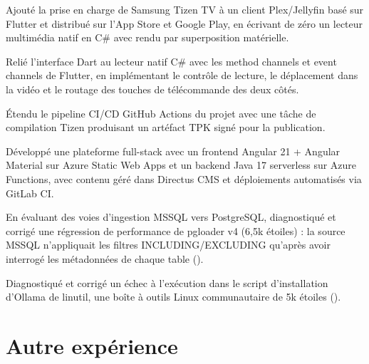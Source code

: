 \documentclass[letterpaper,10pt]{article}
\begin{document}
\begin{resume_list}
\item Ajouté la prise en charge de Samsung Tizen TV à un client Plex/Jellyfin basé sur Flutter et distribué sur l'App Store et Google Play, en écrivant de zéro un lecteur multimédia natif en C\# avec rendu par superposition matérielle.
\item Relié l'interface Dart au lecteur natif C\# avec les method channels et event channels de Flutter, en implémentant le contrôle de lecture, le déplacement dans la vidéo et le routage des touches de télécommande des deux côtés.
\item Étendu le pipeline CI/CD GitHub Actions du projet avec une tâche de compilation Tizen produisant un artéfact TPK signé pour la publication.
\end{resume_list}

\begin{resume_list}
\item Développé une plateforme full-stack avec un frontend Angular 21 + Angular Material sur Azure Static Web Apps et un backend Java 17 serverless sur Azure Functions, avec contenu géré dans Directus CMS et déploiements automatisés via GitLab CI.
\end{resume_list}

\begin{resume_list}
\item En évaluant des voies d'ingestion MSSQL vers PostgreSQL, diagnostiqué et corrigé une régression de performance de pgloader v4 (6,5k étoiles) : la source MSSQL n'appliquait les filtres INCLUDING/EXCLUDING qu'après avoir interrogé les métadonnées de chaque table ().
\item Diagnostiqué et corrigé un échec à l'exécution dans le script d'installation d'Ollama de linutil, une boîte à outils Linux communautaire de 5k étoiles ().
\end{resume_list}

\section{Autre expérience}
\end{document}
